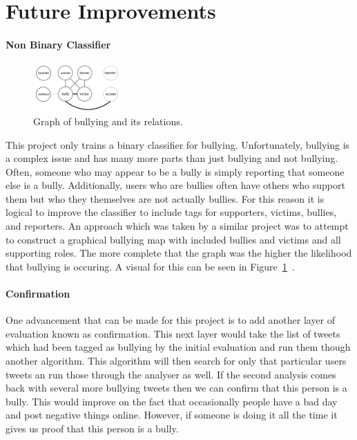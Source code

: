\documentclass[11pt,letterpaper]{article}
\begin{document}
\section{Future Improvements}
\paragraph{Non Binary Classifier}
\begin{figure}[h!]
\label{bully-figure} 
  \caption{Graph of bullying and its relations.}
  \centering
    \includegraphics[width=0.3\textwidth]{bullyDiagram}
\end{figure}
This project only trains a binary classifier for bullying. Unfortunately, bullying is a complex issue and has many more parts than just bullying and not bullying. Often, someone who may appear to be a bully is simply reporting that someone else is a bully. Additionally, users who are bullies often have others who support them but who they themselves are not actually bullies. For this reason it is logical to improve the classifier to include tags for supporters, victims, bullies, and reporters. An approach which was taken by a similar project was to attempt to construct a graphical bullying map with included bullies and victims and all supporting roles. The more complete that the graph was the higher the likelihood that bullying is occuring. A visual for this can be seen in Figure~\ref{bully-figure}~\cite{SentiBullying}.
\paragraph{Confirmation}
One advancement that can be made for this project is to add another layer of evaluation known as confirmation. This next layer would take the list of tweets which had been tagged as bullying by the initial evaluation and run them though another algorithm. This algorithm will then search for only that particular users tweets an run those through the analyser as well. If the second analysis comes back with several more bullying tweets then we can confirm that this person is a bully. This would improve on the fact that occasionally people have a bad day and post negative things online. However, if someone is doing it all the time it gives us proof that this person is a bully.
\end{document}
